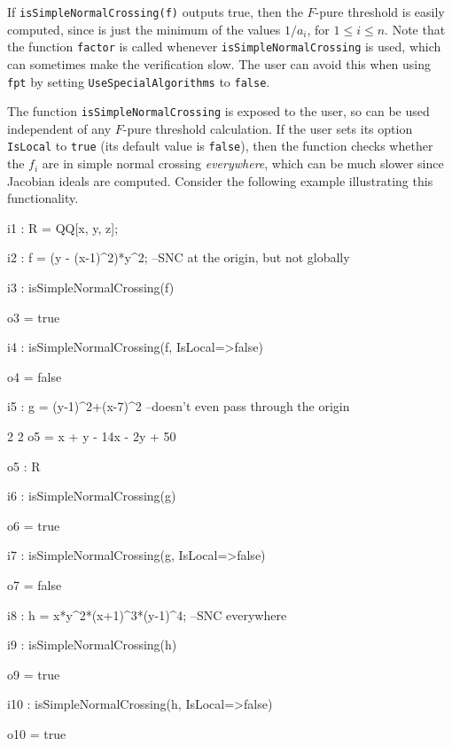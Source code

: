 \documentclass{amsart}
\begin{document}
            
If {\tt isSimpleNormalCrossing(f)} outputs true, then the $F$-pure threshold is easily computed, since is just the minimum of the values $1/a_i$, for $1 \leq i \leq n$.
Note that the function {\tt factor} is called whenever {\tt isSimpleNormalCrossing} is used, which can sometimes make the verification slow.  The user can avoid this when using {\tt fpt} by setting {\tt UseSpecialAlgorithms} to {\tt false}.

The function {\tt isSimpleNormalCrossing} is exposed to the user, so can be used independent of any $F$-pure threshold calculation.  
If the user sets its option {\tt IsLocal} to {\tt true} (its default value is {\tt false}), then the function checks whether the $f_i$ are in simple normal crossing \emph{everywhere}, which can be much slower since Jacobian ideals are computed. Consider the following example illustrating this functionality.

{\small
{}
\begin{MyVerbatim}

i1 : R = QQ[x, y, z];

i2 : f = (y - (x-1)^2)*y^2; --SNC at the origin, but not globally

i3 : isSimpleNormalCrossing(f)

o3 = true

i4 : isSimpleNormalCrossing(f, IsLocal=>false)

o4 = false

i5 : g = (y-1)^2+(x-7)^2 --doesn't even pass through the origin

       2    2
o5 = x  + y  - 14x - 2y + 50

o5 : R

i6 : isSimpleNormalCrossing(g)

o6 = true

i7 : isSimpleNormalCrossing(g, IsLocal=>false)

o7 = false

i8 : h = x*y^2*(x+1)^3*(y-1)^4; --SNC everywhere

i9 : isSimpleNormalCrossing(h)

o9 = true

i10 : isSimpleNormalCrossing(h, IsLocal=>false)

o10 = true
\end{MyVerbatim}
}
\medspace
\end{document}

